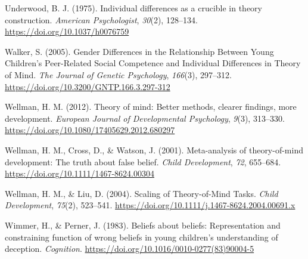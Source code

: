 \documentclass[
  man,floatsintext]{apa6}
\newlength{\cslhangindent}
\newlength{\cslentryspacingunit} %
\newenvironment{CSLReferences}[2] %
 {%
  \setlength{\parindent}{0pt}
  \ifodd #1
  \let\oldpar\par
  \def\par{\hangindent=\cslhangindent\oldpar}
  \fi
  \setlength{\parskip}{#2\cslentryspacingunit}
 }%
 {}
\begin{document}
\begin{CSLReferences}{1}{0}
\leavevmode{}%
Underwood, B. J. (1975). Individual differences as a crucible in theory construction. \emph{American Psychologist}, \emph{30}(2), 128--134. \url{https://doi.org/10.1037/h0076759}

\leavevmode{}%
Walker, S. (2005). Gender {Differences} in the {Relationship Between Young Children}'s {Peer-Related Social Competence} and {Individual Differences} in {Theory} of {Mind}. \emph{The Journal of Genetic Psychology}, \emph{166}(3), 297--312. \url{https://doi.org/10.3200/GNTP.166.3.297-312}

\leavevmode{}%
Wellman, H. M. (2012). Theory of mind: {Better} methods, clearer findings, more development. \emph{European Journal of Developmental Psychology}, \emph{9}(3), 313--330. \url{https://doi.org/10.1080/17405629.2012.680297}

\leavevmode{}%
Wellman, H. M., Cross, D., \& Watson, J. (2001). Meta-analysis of theory-of-mind development: {The} truth about false belief. \emph{Child Development}, \emph{72}, 655--684. \url{https://doi.org/10.1111/1467-8624.00304}

\leavevmode{}%
Wellman, H. M., \& Liu, D. (2004). Scaling of {Theory-of-Mind Tasks}. \emph{Child Development}, \emph{75}(2), 523--541. \url{https://doi.org/10.1111/j.1467-8624.2004.00691.x}

\leavevmode{}%
Wimmer, H., \& Perner, J. (1983). Beliefs about beliefs: {Representation} and constraining function of wrong beliefs in young children's understanding of deception. \emph{Cognition}. \url{https://doi.org/10.1016/0010-0277(83)90004-5}

\end{CSLReferences}

\endgroup
\end{document}

